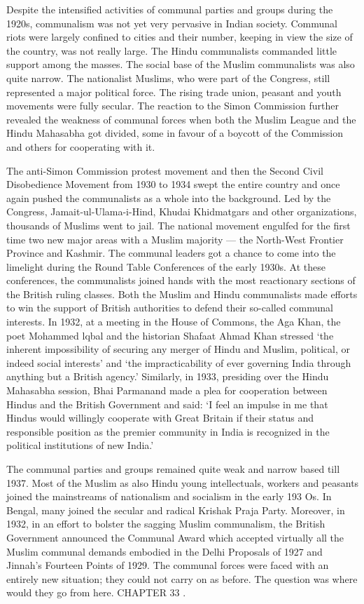 Despite the intensified activities of communal parties and groups during the 1920s, communalism was not yet very pervasive in Indian society. Communal riots were largely confined to cities and their number, keeping in view the size of the country, was not really large. The Hindu communalists commanded little support among the masses. The social base of the Muslim communalists was also quite narrow. The nationalist Muslims, who were part of the Congress, still represented a major political force. The rising trade union, peasant and youth movements were fully secular. The reaction to the Simon Commission further revealed the weakness of communal forces when both the Muslim League and the Hindu Mahasabha got divided, some in favour of a boycott of the Commission and others for cooperating with it. 

The anti-Simon Commission protest movement and then the Second Civil Disobedience Movement from 1930 to 1934 swept the entire country and once again pushed the communalists as a whole into the background. Led by the Congress, Jamait-ul-Ulama-i-Hind, Khudai Khidmatgars and other organizations, thousands of Muslims went to jail. The national movement engulfed for the first time two new major areas with a Muslim majority — the North-West Frontier Province and Kashmir. The communal leaders got a chance to come into the limelight during the Round Table Conferences of the early 1930s. At these conferences, the communalists joined hands with the most reactionary sections of the British ruling classes. Both the Muslim and Hindu communalists made efforts to win the support of British authorities to defend their so-called communal interests. In 1932, at a meeting in the House of Commons, the Aga Khan, the poet Mohammed lqbal and the historian Shafaat Ahmad Khan stressed `the inherent impossibility of securing any merger of Hindu and Muslim, political, or indeed social interests' and `the impracticability of ever governing India through anything but a British agency.' Similarly, in 1933, presiding over the Hindu Mahasabha session, Bhai Parmanand made a plea for cooperation between Hindus and the British Government and said: `I feel an impulse in me that Hindus would willingly cooperate with Great Britain if their status and responsible position as the premier community in India is recognized in the political institutions of new India.' 

The communal parties and groups remained quite weak and narrow based till 1937. Most of the Muslim as also Hindu young intellectuals, workers and peasants joined the mainstreams of nationalism and socialism in the early 193 Os. In Bengal, many joined the secular and radical Krishak Praja Party. Moreover, in 1932, in an effort to bolster the sagging Muslim communalism, the British Government announced the Communal Award which accepted virtually all the Muslim communal demands embodied in the Delhi Proposals of 1927 and Jinnah's Fourteen Points of 1929. The communal forces were faced with an entirely new situation; they could not carry on as before. The question was where would they go from here. CHAPTER 33 . 

